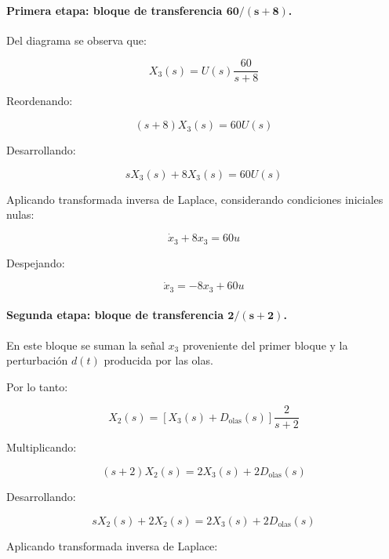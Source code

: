 \documentclass[12pt,a4paper]{article}
\begin{document}
\paragraph{Primera etapa: bloque de transferencia $\boldsymbol{60/(s+8)}$.} Del diagrama se observa que:

\begin{equation}X_3(s)=U(s)\frac{60}{s+8}\end{equation}

Reordenando:

\begin{equation}(s+8)X_3(s)=60U(s)\end{equation}

Desarrollando:

\begin{equation}sX_3(s)+8X_3(s)=60U(s)\end{equation}

Aplicando transformada inversa de Laplace, considerando condiciones iniciales nulas:

\begin{equation}\dot{x}_3+8x_3=60u\end{equation}

Despejando:

\begin{equation}\boxed{\dot{x}_3=-8x_3+60u}\end{equation}
\paragraph{Segunda etapa: bloque de transferencia $\boldsymbol{2/(s+2)}$.} En este bloque se suman la señal $x_3$ proveniente del primer bloque y la perturbación $d(t)$ producida por las olas.

Por lo tanto:

\begin{equation}X_2(s)=\left[X_3(s)+D_{\mathrm{olas}}(s)\right] \frac{2}{s+2}\end{equation}

Multiplicando:

\begin{equation}(s+2)X_2(s)=2X_3(s)+2D_{\mathrm{olas}}(s)\end{equation}

Desarrollando:

\begin{equation}sX_2(s)+2X_2(s)=2X_3(s)+2D_{\mathrm{olas}}(s)\end{equation}

Aplicando transformada inversa de Laplace:
\end{document}

